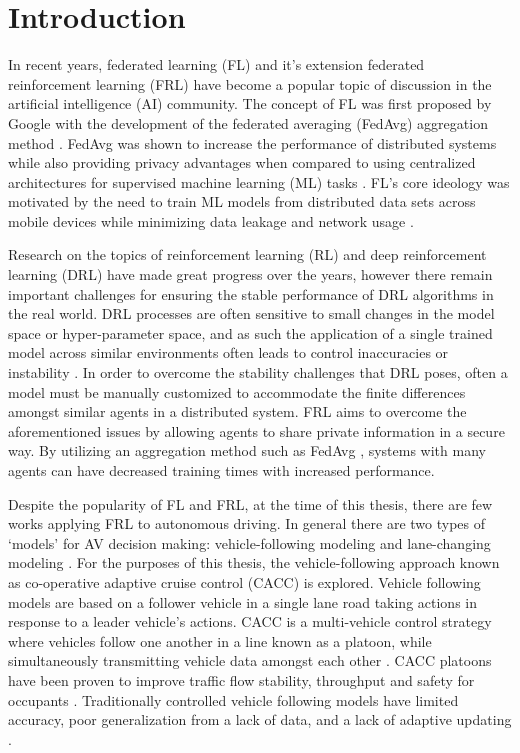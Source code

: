 \chapter{Introduction}
In recent years, federated learning (FL) and it's extension federated reinforcement learning
(FRL) have become a popular topic of discussion in the artificial intelligence (AI)
community.  The concept of FL was first proposed by Google with the development of the
federated averaging (FedAvg) aggregation method \cite{McMahan2016FederatedLO}.
FedAvg was shown to increase the performance of distributed systems while also providing
privacy advantages when compared to using centralized architectures for supervised machine
learning (ML) tasks \cite{Konecny2015, BrendanMcMahan2017a, McMahan2016FederatedLO}.
FL's core ideology was motivated by the need to train ML models from distributed data sets
across mobile devices while minimizing data leakage and network usage
\cite{McMahan2016FederatedLO}.

Research on the topics of reinforcement learning (RL) and deep reinforcement learning (DRL)
have made great progress over the years, however there remain important challenges for
ensuring the stable performance of DRL algorithms in the real world. DRL processes are
often sensitive to small changes in the model space or hyper-parameter space, and as such
the application of a single trained model across similar environments often leads to control
inaccuracies or instability \cite{Yang2019a, Lim2020}.   In order to overcome the
stability challenges that DRL poses, often a model must be manually customized to
accommodate the finite differences amongst similar agents in a distributed system.
FRL aims to overcome the aforementioned issues by allowing agents to share private
information in a secure way.  By utilizing an aggregation method such as FedAvg
\cite{McMahan2016FederatedLO}, systems with many agents can have decreased training
times with increased performance.

Despite the popularity of FL and FRL, at the time of this thesis, there are few works applying FRL to autonomous
driving.  In general there are two types of `models' for AV decision making:
vehicle-following modeling and lane-changing modeling \cite{Ye2019}. For the purposes of
this thesis, the vehicle-following approach known as co-operative adaptive cruise control
(CACC) is explored. Vehicle following models are based on a follower vehicle in a single lane road taking actions
in response to a leader vehicle's actions\cite{Zhu2018}.  CACC is a
multi-vehicle control strategy where vehicles follow one another in a line known as a
platoon, while simultaneously transmitting vehicle data amongst each other \cite{Song2020}.
CACC platoons have been proven to improve traffic flow stability, throughput and safety
for occupants \cite{Song2020, Chu2019b}.  Traditionally controlled vehicle following
models have limited accuracy, poor generalization from a lack of data, and a lack of
adaptive updating \cite{Zhu2018}.

